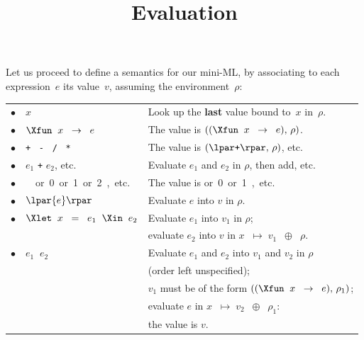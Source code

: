 \documentclass[wide]{slides}
\begin{document}
\begin{slide}
  \title{Evaluation}

  Let us proceed to define a semantics for our mini-ML, by associating
  to each expression~\(e\) its value~\(v\), assuming the
  environment~\(\rho\):

  \bigskip

  \begin{tabular}{r@{\,\,}ll@{}}
    $\bullet$
  & $x$
  & Look up the \textbf{last} value bound to~\(x\) in~\(\rho\).\\
    $\bullet$
  & $\Xfun \;\; x \;\; \rightarrow \;\; e$
  & The value is $((\Xfun \;\; x \;\; \rightarrow \;\; e), \,\rho)$.\\
    $\bullet$
  & \texttt{+} \ \texttt{-} \ \texttt{/} \ \texttt{*}
  & The value is $(\lpar\texttt{+}\rpar, \,\rho)$, etc.\\
    $\bullet$
  & $e_1$ \texttt{+} $e_2$, etc.
  & Evaluate $e_1$ and $e_2$ in $\rho$, then add, etc.\\
    $\bullet$
  & \unit \ or \textsf{0} or \textsf{1} or \textsf{2}, etc.
  & The value is \unit or \textsf{0} or \textsf{1}, etc.\\
    $\bullet$
  & $\lpar{e}\rpar$
  & Evaluate $e$ into $v$ in $\rho$.\\
    $\bullet$
  & $\Xlet \;\; x \;\; = \;\; e_1 \;\; \Xin \;\; e_2$
  & Evaluate $e_1$ into $v_1$ in $\rho$;\\
  &
  & evaluate $e_2$ into $v$ in $x \;\; \mapsto \; v_1 \;\; \oplus \;\;
    \rho$.\\
    $\bullet$
  & $e_1 \;\; e_2$
  & Evaluate $e_1$ and $e_2$ into $v_1$ and $v_2$ in $\rho$\\
  &
  & (order left unspecified);\\
  &
  & $v_1$ must be of the form $((\Xfun \;\; x \;\; \rightarrow \;\;
    e), \, \rho_1)$;\\
  &
  & evaluate $e$ in $x \;\; \mapsto \; v_2 \;\; \oplus \;\;
    \rho_1$:\\
  && the value is $v$.
\end{tabular}

\end{slide}
\end{document}
